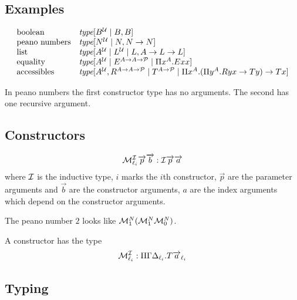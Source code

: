 \subsection{Examples}
$$
    \begin{array}{lll}
        \text{boolean}
        &
        {\text{\it type}}[B^{\mathcal U} \mid B, B]
        \\
        \text{peano numbers}
        &
        {\text{\it type}}[N^{\mathcal U} \mid N, N\to N]
        \\
        \text{list}
        &
        {\text{\it type}}[A^{\mathcal U} \mid L^{\mathcal U} \mid L, A \to L\to L]
        \\
        \text{equality}
        &
        {\text{\it type}}[A^{\mathcal U}
        \mid E^{A \to A \to {\mathcal P}}
        \mid \Pi x^A. E x x]
        \\
        \text{accessibles}
        &
        {\text{\it type}}[
            A^{\mathcal U}, R^{A \to A \to {\mathcal P}}
            \mid
            T^{A \to {\mathcal P}}
            \mid
            \Pi x^A. (\Pi y^A. R y x \to T y) \to T x
        ]
    \end{array}
$$

In peano numbers the first constructor type has no arguments. The second has one
recursive argument.




\subsection{Constructors}

$$
    {\cal M}^{\cal I}_{\ell_i} {\overrightarrow {p}} {\overrightarrow {b}}: {\cal I} {\overrightarrow {p}} {\overrightarrow {a}}
$$
where ${\cal I}$ is the inductive type, $i$ marks the $i$th constructor, $\vec p$ are
the parameter arguments and $\vec b$ are the constructor arguments, $a$ are the
index arguments which depend on the constructor arguments.

The peano number $2$ looks like $ {\cal M}^N_1 ({\cal M}^N_1 {\cal M}^N_0) $.

A constructor has the type
$$
    {\cal M}^{\cal I}_{\ell_i} : \Pi \Gamma \Delta_{\ell_i}. T {{\overrightarrow {a}}}_{\ell_i}
$$





\subsection{Typing}

